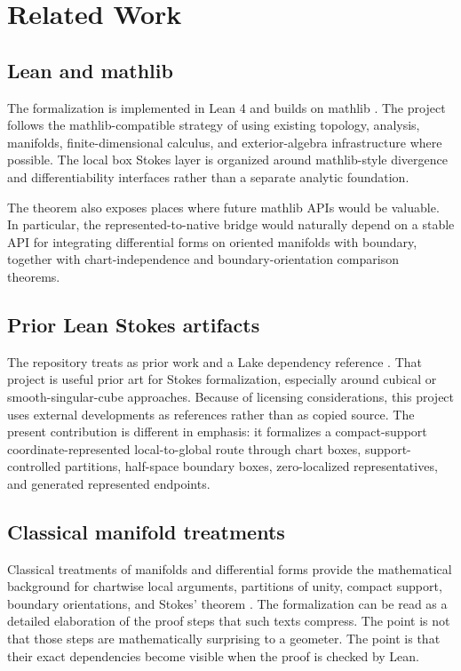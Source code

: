 \section{Related Work}
\label{sec:related-work}

\subsection{Lean and mathlib}

The formalization is implemented in Lean 4
\cite{demoura2015lean,demoura2021lean4,leanprover,tpil4} and builds on mathlib
\cite{mathlib2020,mathlibdocs,vandoorn2020maintaining,baanen2025growing}.  The project follows the mathlib-compatible
strategy of using existing topology, analysis, manifolds, finite-dimensional
calculus, and exterior-algebra infrastructure where possible.  The local box
Stokes layer is organized around mathlib-style divergence and differentiability
interfaces rather than a separate analytic foundation.

The theorem also exposes places where future mathlib APIs would be valuable.
In particular, the represented-to-native bridge would naturally depend on a
stable API for integrating differential forms on oriented manifolds with
boundary, together with chart-independence and boundary-orientation comparison
theorems.

\subsection{Prior Lean Stokes artifacts}

The repository treats  as prior work and a Lake
dependency reference \cite{leanstokes}.  That project is useful prior art for
Stokes formalization, especially around cubical or smooth-singular-cube
approaches.  Because of licensing considerations, this project uses external
developments as references rather than as copied source.  The present
contribution is different in emphasis: it formalizes a compact-support
coordinate-represented local-to-global route through chart boxes,
support-controlled partitions, half-space boundary boxes, zero-localized
representatives, and generated represented endpoints.

\subsection{Classical manifold treatments}

Classical treatments of manifolds and differential forms provide the
mathematical background for chartwise local arguments, partitions of unity,
compact support, boundary orientations, and Stokes' theorem
\cite{spivak1965calculus,munkres1991analysis,guillemin1974differential,bott1982differential,hirsch1976differential,warner1983foundations,abraham1988manifolds,lang1995differential,tu2011introduction,lee2013smooth,morita2001geometry}.
The formalization can be read as a detailed elaboration of the proof steps
that such texts compress.  The point is not that those steps are
mathematically surprising to a geometer.  The point is that their exact
dependencies become visible when the proof is checked by Lean.

